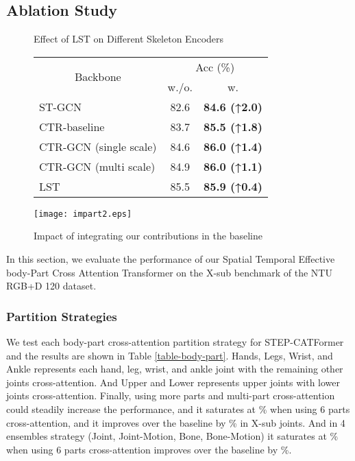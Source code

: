 \documentclass{bmvc2k}
\begin{document}
\subsection{Ablation Study}

\begin{figure}[h]
  \def\@captype{table}
  \begin{minipage}[]{.4\textwidth}
    \caption{Effect of LST on Different Skeleton Encoders}
    \small
\begin{tabular}{lcc}
\hline
\multicolumn{1}{c}{\multirow{2}{*}{Backbone}} & \multicolumn{2}{c}{Acc (\%)}                                          \\
\multicolumn{1}{c}{}      & \multicolumn{1}{c}{w./o.} & \multicolumn{1}{c}{w.} \\ \hline
\hline
ST-GCN                    & 82.6            & \textbf{84.6 (↑2.0)}         \\
CTR-baseline              & 83.7            & \textbf{85.5 (↑1.8)}         \\
CTR-GCN (single scale)    & 84.6            & \textbf{86.0 (↑1.4)}         \\
CTR-GCN (multi scale)     & 84.9            & \textbf{86.0 (↑1.1)}         \\
LST                       & 85.5            & \textbf{85.9 (↑0.4)}         \\  \hline
\end{tabular}
    \label{table-backbone}
  \end{minipage}
\hfill
\begin{minipage}[]{.43\textwidth}

    \texttt{[image: impart2.eps]}

    \caption{Impact of integrating our contributions in the baseline}
    \label{fig-impart}
  \end{minipage}
\end{figure}


In this section, we evaluate the performance of our Spatial Temporal Effective body-Part Cross Attention Transformer on the X-sub benchmark of the NTU RGB+D 120 dataset. 
\subsubsection*{Partition Strategies}
We test each body-part cross-attention partition strategy for STEP-CATFormer and the results are shown in Table \ref{table-body-part}. Hands, Legs, Wrist, and Ankle represents each hand, leg, wrist, and ankle joint with the remaining other joints cross-attention. And Upper and Lower represents upper joints with lower joints cross-attention. Finally, using more parts and multi-part cross-attention could steadily increase the performance, and it saturates at \% when using 6 parts cross-attention, and it improves over the baseline by \% in X-sub joints. And in 4 ensembles strategy (Joint, Joint-Motion, Bone, Bone-Motion) it saturates at \% when using 6 parts cross-attention improves over the baseline by \%.
\end{document}
